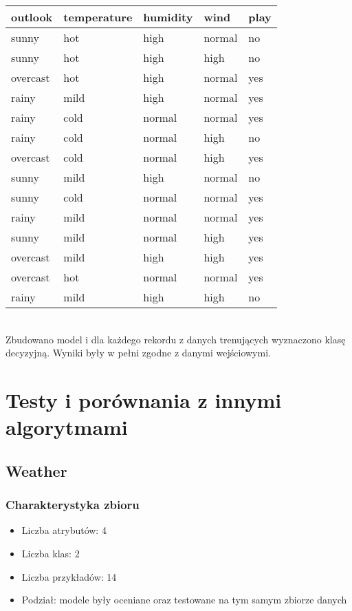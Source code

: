 \documentclass[16]{article}
\begin{document}
\begin{tabular}{ |l|l|l|l|l| }
\hline
outlook & temperature & humidity & wind & play
\\ \hline
sunny & hot & high & normal & no
\\ \hline
sunny & hot & high & high & no
\\ \hline
overcast & hot & high & normal & yes
\\ \hline
rainy & mild & high & normal & yes
\\ \hline
rainy & cold & normal & normal & yes
\\ \hline
rainy & cold & normal & high & no
\\ \hline
overcast & cold & normal & high & yes
\\ \hline
sunny & mild & high & normal & no
\\ \hline
sunny & cold & normal & normal & yes
\\ \hline
rainy & mild & normal & normal & yes
\\ \hline
sunny & mild & normal & high & yes
\\ \hline
overcast & mild & high & high & yes
\\ \hline
overcast & hot & normal & normal & yes
\\ \hline
rainy & mild & high & high & no
\\ \hline
\end{tabular}\\

Zbudowano model i dla każdego rekordu z danych trenujących wyznaczono klasę decyzyjną. Wyniki były w pełni zgodne z danymi wejściowymi. 



\section{Testy i porównania z innymi algorytmami}

\subsection{Weather}

\subsubsection{Charakterystyka zbioru}

\begin{itemize}
	\item Liczba atrybutów: 4
	\item Liczba klas: 2
	\item Liczba przykładów: 14
	\item Podział: modele były oceniane oraz testowane na tym samym zbiorze danych
\end{itemize}
\end{document}
